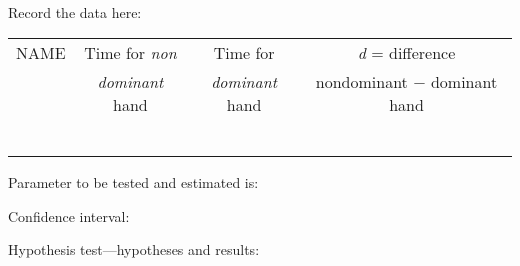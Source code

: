 \noindent {}\\
\vspace{14pt}
\noindent Record the data here:\\

\begin{table}[!ht]
\begin{center}
\begin{tabular}{|l|c|c|c|}
\hline
NAME \hspace{1.5in} & Time for \textit{non} & Time for & \textit{d} = difference\\
& \textit{dominant} hand & \textit{dominant} hand & nondominant $-$ dominant hand\\[.2em]
  \hline
 & & &\\[.6em]
\hline
 & & &\\[.6em]
\hline
 & & &\\[.6em]
\hline
 & & &\\[.6em]
\hline
 & & &\\[.6em]
\hline
 & & &\\[.6em]
\hline
\end{tabular}
\end{center}
\end{table}

\noindent Parameter to be tested and estimated is:\\

\vspace{.25\textheight}

\noindent Confidence interval:\\

\vspace{.25\textheight}

\noindent Hypothesis test---hypotheses and results:


